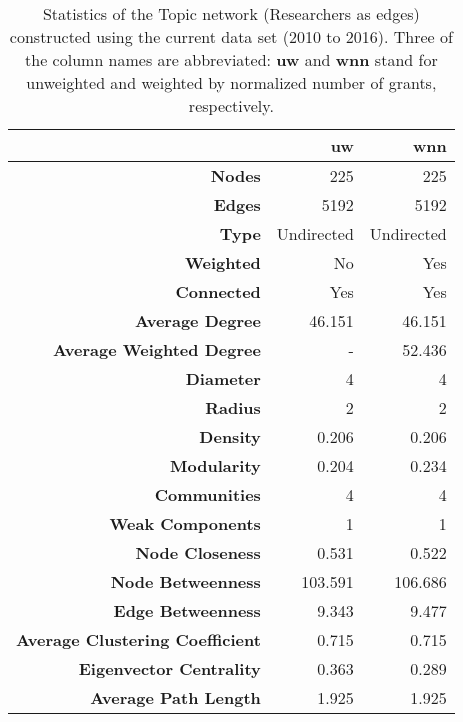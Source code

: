 \begin{table}[!htbp]
\centering
\caption[Statistics of the Topic network (Researchers as edges) constructed using the current data set (2010 to 2016)]{Statistics of the Topic network (Researchers as edges) constructed using the current data set (2010 to 2016). Three of the column names are abbreviated: \textbf{uw} and \textbf{wnn} stand for unweighted and weighted by normalized number of grants, respectively.}
\label{table:topic_b_current_stats_appendix}
\begin{tabular}{r|rr}
{} & \textbf{uw} & \textbf{wnn}\\
\hline
\textbf{Nodes} & {225} & {225}\\
\textbf{Edges} & {5192} & {5192}\\
\textbf{Type} & {Undirected} & {Undirected}\\
\textbf{Weighted} & {No} & {Yes}\\
\textbf{Connected} & {Yes} & {Yes}\\
\textbf{Average Degree} & {46.151} & {46.151}\\
\textbf{Average Weighted Degree} & {-} & {52.436}\\
\textbf{Diameter} & {4} & {4}\\
\textbf{Radius} & {2} & {2}\\
\textbf{Density} & {0.206} & {0.206}\\
\textbf{Modularity} & {0.204} & {0.234}\\
\textbf{Communities} & {4} & {4}\\
\textbf{Weak Components} & {1} & {1}\\
\textbf{Node Closeness} & {0.531} & {0.522}\\
\textbf{Node Betweenness} & {103.591} & {106.686}\\
\textbf{Edge Betweenness} & {9.343} & {9.477}\\
\textbf{Average Clustering Coefficient} & {0.715} & {0.715}\\
\textbf{Eigenvector Centrality} & {0.363} & {0.289}\\
\textbf{Average Path Length} & {1.925} & {1.925}
\end{tabular}
\end{table}

